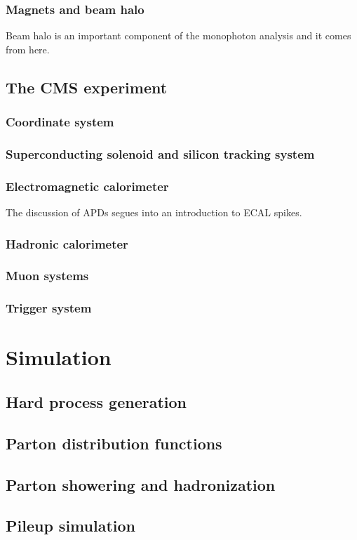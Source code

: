 \documentclass[oneside, letterpaper, 12pt, oldfontcommands]{memoir}
\begin{document}
\subsection{Magnets and beam halo}
Beam halo is an important component of the monophoton analysis and it comes from here.
\section{The CMS experiment}
\subsection{Coordinate system}
\subsection{Superconducting solenoid and silicon tracking system}
\subsection{Electromagnetic calorimeter}
The discussion of APDs segues into an introduction to ECAL spikes.
\subsection{Hadronic calorimeter}
\subsection{Muon systems}
\subsection{Trigger system}

\chapter{Simulation}
\section{Hard process generation}
\section{Parton distribution functions}
\section{Parton showering and hadronization}
\section{Pileup simulation}
\end{document}

